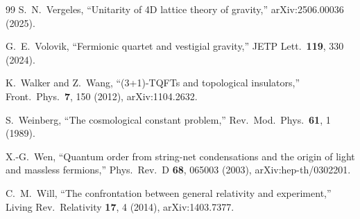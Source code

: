 \documentclass[aps,prd,nofootinbib,superscriptaddress,12pt]{revtex4-2}
\begin{document}
\begin{thebibliography}{99}
S.~N.~Vergeles,
``Unitarity of 4D lattice theory of gravity,''
arXiv:2506.00036 (2025).

G.~E.~Volovik,
``Fermionic quartet and vestigial gravity,''
JETP Lett.\ \textbf{119}, 330 (2024).

K.~Walker and Z.~Wang,
``(3+1)-TQFTs and topological insulators,''
Front.\ Phys.\ \textbf{7}, 150 (2012),
arXiv:1104.2632.

S.~Weinberg,
``The cosmological constant problem,''
Rev.\ Mod.\ Phys.\ \textbf{61}, 1 (1989).

X.-G.~Wen,
``Quantum order from string-net condensations and the origin of light
and massless fermions,''
Phys.\ Rev.\ D \textbf{68}, 065003 (2003),
arXiv:hep-th/0302201.

C.~M.~Will,
``The confrontation between general relativity and experiment,''
Living Rev.\ Relativity \textbf{17}, 4 (2014),
arXiv:1403.7377.


\end{thebibliography}
\end{document}
